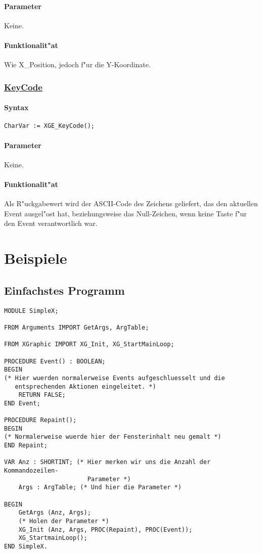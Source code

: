 \paragraph{Parameter}
Keine.

\paragraph{Funktionalit"at}
Wie X\_Position, jedoch f"ur die Y-Koordinate.


\subsubsection{\underline{KeyCode}}


\paragraph{Syntax}
\begin{verbatim}
CharVar := XGE_KeyCode();
\end{verbatim}
\paragraph{Parameter}
Keine.

\paragraph{Funktionalit"at}
Als R"uckgabewert wird der ASCII-Code des Zeichens geliefert, das
den aktuellen Event ausgel"ost hat, beziehungsweise das Null-Zeichen,
wenn keine Taste f"ur den Event verantwortlich war.




\section{Beispiele\label{Beispiel}}




\subsection{Einfachstes Programm}
\begin{verbatim}
MODULE SimpleX;

FROM Arguments IMPORT GetArgs, ArgTable;

FROM XGraphic IMPORT XG_Init, XG_StartMainLoop;

PROCEDURE Event() : BOOLEAN;
BEGIN
(* Hier wuerden normalerweise Events aufgeschluesselt und die
   entsprechenden Aktionen eingeleitet. *)
    RETURN FALSE;
END Event;

PROCEDURE Repaint();
BEGIN
(* Normalerweise wuerde hier der Fensterinhalt neu gemalt *)
END Repaint;

VAR Anz : SHORTINT; (* Hier merken wir uns die Anzahl der Kommandozeilen-
                       Parameter *)
    Args : ArgTable; (* Und hier die Parameter *)

BEGIN
    GetArgs (Anz, Args);
    (* Holen der Parameter *)
    XG_Init (Anz, Args, PROC(Repaint), PROC(Event));
    XG_StartmainLoop();
END SimpleX.
\end{verbatim}

